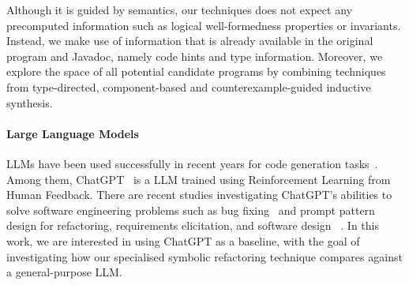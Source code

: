 \documentclass[10pt,conference]{IEEEtran}
\begin{document}
%
%
%

Although it is guided by semantics, our techniques does not expect any
precomputed information such as logical well-formedness properties or
invariants. Instead, we make use of information that is already
available in the original program and Javadoc, namely code hints and
type information. Moreover, we explore the space of all potential
candidate programs by combining techniques from type-directed,
component-based and counterexample-guided inductive synthesis.

\paragraph{Large Language Models}
LLMs have been used successfully in recent years for code generation tasks~\cite{DBLP:journals/corr/abs-2108-07732,DBLP:journals/corr/abs-2302-05527,DBLP:journals/corr/abs-2202-13169}.
Among them, ChatGPT~\cite{chatgpt} is a LLM trained using Reinforcement Learning from Human Feedback.
There are recent studies investigating ChatGPT's abilities to solve software engineering problems such as bug fixing~\cite{sobania2023analysis,chatgptbugs} and 
prompt pattern design for refactoring, requirements elicitation, and software design ~\cite{white2023chatgpt}.
In this work, we are interested in using ChatGPT as a baseline, with the goal of investigating how our specialised symbolic refactoring technique compares
against a general-purpose LLM.
\end{document}
